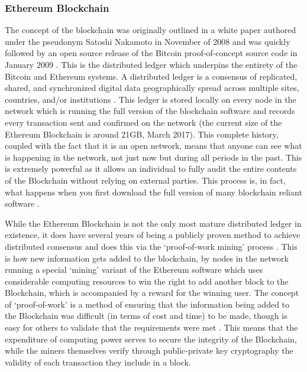 \documentclass{article}
\begin{document}
\subsubsection{Ethereum Blockchain}
The concept of the blockchain was originally outlined in a white paper \citep{12_nakamoto_2008} authored under the pseudonym Satoshi Nakamoto in November of 2008 and was quickly followed by an open source release of the Bitcoin proof-of-concept source code in January 2009 \citep{13_nakamoto_2009}. This is the distributed ledger which underpins the entirety of the Bitcoin and Ethereum systems. A distributed ledger is a consensus of replicated, shared, and synchronized digital data geographically spread across multiple sites, countries, and/or institutions \citep{24_distributed_ledgers_and_blockchain_technology_2016}. This ledger is stored locally on every node in the network which is running the full version of the blockchain software \citep{14_bitcoin_2009} and records every transaction sent and confirmed on the network (the current size of the Ethereum Blockchain is around 21GB, March 2017\citep{25_blockchain_size_2016}). This complete history, coupled with the fact that it is an open network, means that anyone can see what is happening in the network, not just now but during all periods in the past. This is extremely powerful as it allows an individual to fully audit the entire contents of the Blockchain without relying on external parties. This process is, in fact, what happens when you first download the full version of many blockchain reliant software \citep{20_developer_guide_bitcoin_2016}.

While the Ethereum Blockchain is not the only most mature distributed ledger in existence, it does have several years of being a publicly proven method to achieve distributed consensus and does this via the `proof-of-work mining' process \citep{24_distributed_ledgers_and_blockchain_technology_2016}. This is how new information gets added to the blockchain, by nodes in the network running a special `mining' variant of the Ethereum software which uses considerable computing resources to win the right to add another block to the Blockchain, which is accompanied by a reward for the winning user. The concept of `proof-of-work' is a method of ensuring that the information being added to the Blockchain was difficult (in terms of cost and time) to be made, though is easy for others to validate that the requirements were met \citep{26_blockchain_mining_-_distributed_ledgers_and_blockchain_technology_2016}. This means that the expenditure of computing power serves to secure the integrity of the Blockchain, while the miners themselves verify through public-private key cryptography the validity of each transaction they include in a block.
\end{document}
